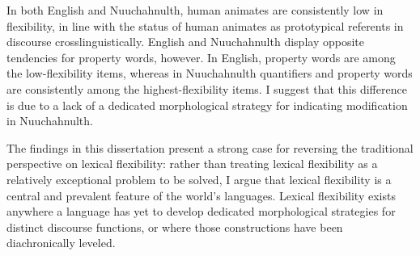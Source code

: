 In both English and Nuuchahnulth, human animates are consistently low in flexibility, in line with the status of human animates as prototypical referents in discourse crosslinguistically. English and Nuuchahnulth display opposite tendencies for property words, however. In English, property words are among the low-flexibility items, whereas in Nuuchahnulth quantifiers and property words are consistently among the highest-flexibility items. I suggest that this difference is due to a lack of a dedicated morphological strategy for indicating modification in Nuuchahnulth.

The findings in this dissertation present a strong case for reversing the traditional perspective on lexical flexibility: rather than treating lexical flexibility as a relatively exceptional problem to be solved, I argue that lexical flexibility is a central and prevalent feature of the world's languages. Lexical flexibility exists anywhere a language has yet to develop dedicated morphological strategies for distinct discourse functions, or where those constructions have been diachronically leveled.
